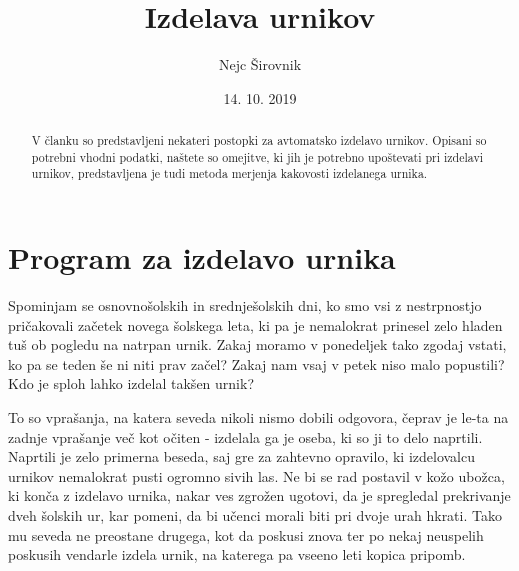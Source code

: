 \documentclass[a4paper]{article}
\begin{document}

\title{Izdelava urnikov}
\author{Nejc Širovnik}
\date{14. 10. 2019}

\maketitle


\begin{abstract}

   V članku so predstavljeni nekateri postopki za avtomatsko izdelavo urnikov. Opisani so
   potrebni vhodni podatki, naštete so omejitve, ki jih je potrebno upoštevati pri izdelavi
   urnikov, predstavljena je tudi metoda merjenja kakovosti izdelanega urnika.
\end{abstract}

\section{Program za izdelavo urnika} %

Spominjam se osnovnošolskih in srednješolskih dni, ko smo vsi z nestrpnostjo pričakovali
začetek novega šolskega leta, ki pa je nemalokrat prinesel zelo hladen tuš ob pogledu na
natrpan urnik. Zakaj moramo v ponedeljek tako zgodaj vstati, ko pa se teden še ni niti
prav začel? Zakaj nam vsaj v petek niso malo popustili? Kdo je sploh lahko izdelal
takšen urnik?

To so vprašanja, na katera seveda nikoli nismo dobili odgovora, čeprav je le-ta na zadnje
vprašanje več kot očiten - izdelala ga je oseba, ki so ji to delo naprtili. Naprtili je
zelo primerna beseda, saj gre za zahtevno opravilo, ki izdelovalcu urnikov nemalokrat
pusti ogromno sivih las. Ne bi se rad postavil v kožo ubožca, ki konča z izdelavo urnika,
nakar ves zgrožen ugotovi, da je spregledal prekrivanje dveh šolskih ur, kar pomeni, da
bi učenci morali biti pri dvoje urah hkrati. Tako mu seveda ne preostane drugega, kot da
poskusi znova ter po nekaj neuspelih poskusih vendarle izdela urnik, na katerega pa vseeno
leti kopica pripomb.
\end{document}
